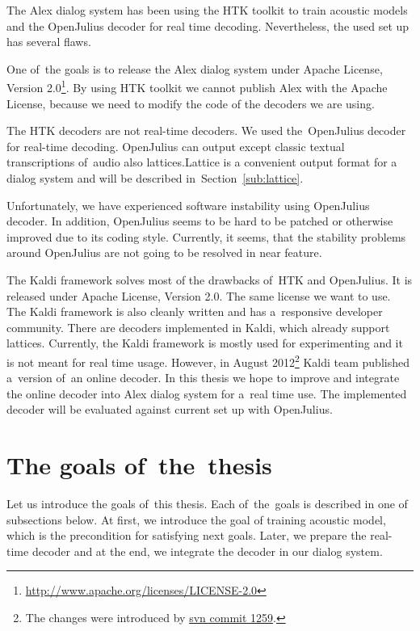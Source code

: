 The Alex dialog system has been using the \ac{HTK} toolkit\cite{young94htk} to train acoustic models and 
the OpenJulius\cite{lee2009julius} decoder for real time decoding. Nevertheless, the used set up has several flaws.

One of~the goals is to release the Alex dialog system under 
Apache License, Version 2.0\footnote{\url{http://www.apache.org/licenses/LICENSE-2.0}}. 
By using \ac{HTK} toolkit we cannot publish Alex with the Apache License, 
because we need to modify the code of the decoders we are using. 

The \ac{HTK} decoders are not real-time decoders\cite{yao2010practical}. 
We used the~OpenJulius decoder for real-time decoding. OpenJulius can output except classic textual transcriptions of~audio
also lattices.Lattice is a convenient output format for a dialog system and will be described in~Section~\ref{sub:lattice}.

Unfortunately, we have experienced software instability using OpenJulius decoder.  
In addition, OpenJulius seems to be hard to be patched or otherwise improved due to its coding style. 
Currently, it seems, that the stability problems around OpenJulius are not going to be resolved in near feature.

The Kaldi\cite{povey2011kaldi} framework solves most of the drawbacks of~\ac{HTK} and OpenJulius. 
It is released under Apache License, Version 2.0. The same license we want to use. 
The Kaldi framework is also cleanly written and has a~responsive developer community. 
There are decoders implemented in Kaldi, which already support lattices. 
Currently, the Kaldi framework is mostly used for experimenting and it is not meant for real time usage. 
However, in August 2012\footnote{The changes were introduced 
by \href{https://sourceforge.net/p/kaldi/code/1259/}{svn commit 1259}.} Kaldi team published a~version of~an online decoder. 
In this thesis we hope to improve and integrate the online decoder into Alex dialog system for a~real time use.
The implemented decoder will be evaluated against current set up with OpenJulius.


\section{The goals of~the~thesis} 
\label{sec:goals}
Let us introduce the goals of~this thesis. Each of~the~goals is described in one of subsections below.
At first, we introduce the goal of training acoustic model, which is the precondition for satisfying next goals.
Later, we prepare the real-time decoder and at the end, we integrate the decoder in our dialog system. 

